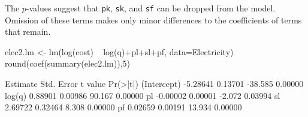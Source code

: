 The $p$-values suggest that \texttt{pk}, \texttt{sk}, and \texttt{sf}
can be dropped from the model. Omission of these terms makes only
minor differences to the coefficients of terms that remain.
\begin{Schunk}
\begin{Sinput}
elec2.lm <- lm(log(cost) ~ log(q)+pl+sl+pf,
               data=Electricity)
round(coef(summary(elec2.lm)),5)
\end{Sinput}
\begin{Soutput}
            Estimate Std. Error t value Pr(>|t|)
(Intercept) -5.28641    0.13701 -38.585  0.00000
log(q)       0.88901    0.00986  90.167  0.00000
pl          -0.00002    0.00001  -2.072  0.03994
sl           2.69722    0.32464   8.308  0.00000
pf           0.02659    0.00191  13.934  0.00000
\end{Soutput}
\end{Schunk}

